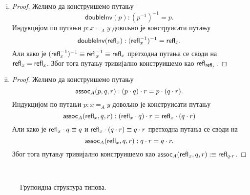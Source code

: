\documentclass[12pt,oneside]{memoir}
\begin{document}
\begin{enumerate}[(i)]
\begin{proof}
\begin{align*}
        \end{align*}
        Али како је $\refl{x}^{-1} \equiv \refl{x}$ претходне путање се своде на оне као и у претходном доказу. Због тога обе путање тривијално конструишемо као $\refl{\refl{x}}$.
    \end{proof}
    \item
    \begin{proof}
        Желимо да конструишемо путању
        \[ \mathsf{doubleInv} (p) : (p^{-1})^{-1} = p. \]
        Индукцијом по путањи $p : x =_A y$ довољно је конструисати путању
        \[ \mathsf{doubleInv} (\mathsf{refl}_{x}) : (\mathsf{refl}_{x}^{-1})^{-1} = \mathsf{refl}_{x}. \]
        Али како је $(\mathsf{refl}_{x}^{-1})^{-1} \equiv \mathsf{refl}_{x}^{-1} \equiv \mathsf{refl}_{x}$ претходна путања се своди на $\mathsf{refl}_{x} = \mathsf{refl}_{x}$. Због тога путању тривијално конструишемо као $\refl{\refl{x}}$. 
    \end{proof} 
    \item
    \begin{proof}
        Желимо да конструишемо путању
        \[ \mathsf{assoc}_{A} (p, q, r) : (p \cdot q) \cdot r = p \cdot (q \cdot r). \]
        Индукцијом по путањи $p : x =_A y$ довољно је конструисати путању
        \[ \mathsf{assoc}_{A} (\mathsf{refl}_{x}, q, r) : (\mathsf{refl}_{x} \cdot q) \cdot r = \mathsf{refl}_{x} \cdot (q \cdot r) \]
        Али како је $\mathsf{refl}_{x} \cdot q \equiv q$ и $\mathsf{refl}_{x} \cdot (q \cdot r) \equiv q \cdot r$ претходна путања се своди на
        \[ \mathsf{assoc}_{A} (\mathsf{refl}_{x}, q, r) : q \cdot r = q \cdot r. \]
        Због тога путању тривијално конструишемо као $\mathsf{assoc}_{A} (\mathsf{refl}_{x}, q, r) :\equiv \mathsf{refl}_{q \cdot r}$.
    \end{proof}
\end{enumerate}

\begin{figure}[!ht]
    \centering\
    \label{fig:inftygroupoid}
    \caption{Групоидна структура типова. }
\end{figure}
\end{document}
